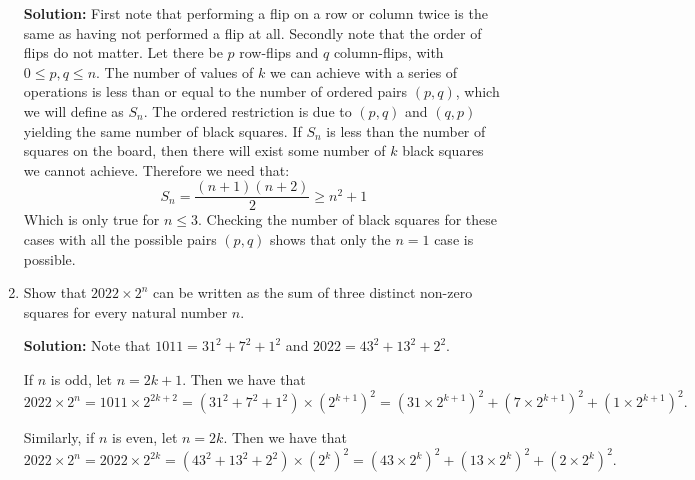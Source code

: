 \documentclass{article}
\begin{document}
\begin{enumerate}[itemsep=24pt]
\textbf{Solution:}
First note that performing a flip on a row or column twice is the same as having not performed a flip at all. Secondly note that the order of flips do not matter. Let there be $p$ row-flips and $q$ column-flips, with $0\leq p,q\leq n$. The number of values of $k$ we can achieve with a series of operations is less than or equal to the number of ordered pairs $(p,q)$, which we will define as $S_n$. The ordered restriction is due to $(p,q)$ and $(q,p)$ yielding the same number of black squares. If $S_n$ is less than the number of squares on the board, then there will exist some number of $k$ black squares we cannot achieve. Therefore we need that:
$$S_n = \frac{(n+1)(n+2)}{2} \geq n^2 + 1$$
Which is only true for $n\leq3$. Checking the number of black squares for these cases with all the possible pairs $(p,q)$ shows that only the $n=1$ case is possible.


\item
Show that $2022 \times 2^n$ can be written as the sum of three distinct non-zero squares for every natural number $n$.

\textbf{Solution:}
Note that $1011 = 31^2 + 7^2 + 1^2$ and $2022 = 43^2 + 13^2 + 2^2$.

If $n$ is odd, let $n = 2k + 1$. Then we have that
\[
    2022 \times 2^n = 1011 \times 2^{2k + 2} = \left( 31^2 + 7^2 + 1^2 \right) \times {\left( 2^{k + 1} \right)}^2 = {\left( 31 \times 2^{k + 1} \right)}^2 + {\left( 7 \times 2^{k + 1} \right)}^2 + {\left( 1 \times 2^{k + 1} \right)}^2.
\]

Similarly, if $n$ is even, let $n = 2k$. Then we have that
\[
    2022 \times 2^n = 2022 \times 2^{2k} = \left( 43^2 + 13^2 + 2^2 \right) \times {\left( 2^{k} \right)}^2 = {\left( 43 \times 2^{k} \right)}^2 + {\left( 13 \times 2^{k} \right)}^2 + {\left( 2 \times 2^{k} \right)}^2.
\]

\end{enumerate}
\end{document}
